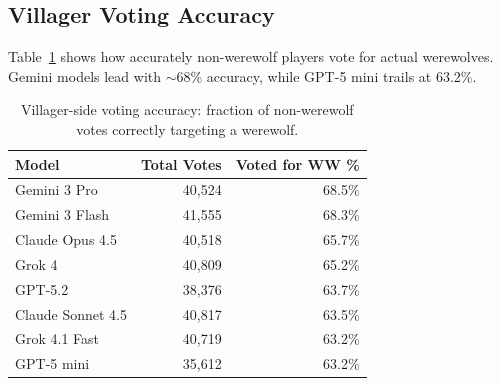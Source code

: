 \subsection{Villager Voting Accuracy}
\label{app:voting_accuracy}

Table~\ref{tab:voting_accuracy} shows how accurately non-werewolf players vote for actual werewolves. Gemini models lead with $\sim$68\% accuracy, while GPT-5 mini trails at 63.2\%.

\begin{table}[ht]
\caption{Villager-side voting accuracy: fraction of non-werewolf votes correctly targeting a werewolf.}
\label{tab:voting_accuracy}
\centering
\small
\begin{tabular}{lrr}
\toprule
\textbf{Model} & \textbf{Total Votes} & \textbf{Voted for WW \%} \\
\midrule
Gemini 3 Pro            & 40,524 & 68.5\% \\
Gemini 3 Flash          & 41,555 & 68.3\% \\
Claude Opus 4.5         & 40,518 & 65.7\% \\
Grok 4                  & 40,809 & 65.2\% \\
GPT-5.2                 & 38,376 & 63.7\% \\
Claude Sonnet 4.5       & 40,817 & 63.5\% \\
Grok 4.1 Fast           & 40,719 & 63.2\% \\
GPT-5 mini              & 35,612 & 63.2\% \\
\bottomrule
\end{tabular}
\end{table}

